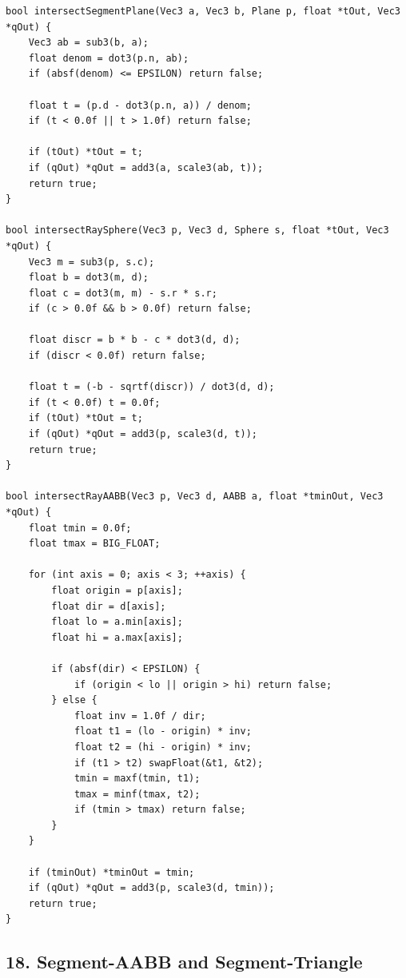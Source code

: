 \documentclass[10pt,letterpaper]{article}
\begin{document}
\begin{verbatim}
bool intersectSegmentPlane(Vec3 a, Vec3 b, Plane p, float *tOut, Vec3 *qOut) {
    Vec3 ab = sub3(b, a);
    float denom = dot3(p.n, ab);
    if (absf(denom) <= EPSILON) return false;

    float t = (p.d - dot3(p.n, a)) / denom;
    if (t < 0.0f || t > 1.0f) return false;

    if (tOut) *tOut = t;
    if (qOut) *qOut = add3(a, scale3(ab, t));
    return true;
}

bool intersectRaySphere(Vec3 p, Vec3 d, Sphere s, float *tOut, Vec3 *qOut) {
    Vec3 m = sub3(p, s.c);
    float b = dot3(m, d);
    float c = dot3(m, m) - s.r * s.r;
    if (c > 0.0f && b > 0.0f) return false;

    float discr = b * b - c * dot3(d, d);
    if (discr < 0.0f) return false;

    float t = (-b - sqrtf(discr)) / dot3(d, d);
    if (t < 0.0f) t = 0.0f;
    if (tOut) *tOut = t;
    if (qOut) *qOut = add3(p, scale3(d, t));
    return true;
}

bool intersectRayAABB(Vec3 p, Vec3 d, AABB a, float *tminOut, Vec3 *qOut) {
    float tmin = 0.0f;
    float tmax = BIG_FLOAT;

    for (int axis = 0; axis < 3; ++axis) {
        float origin = p[axis];
        float dir = d[axis];
        float lo = a.min[axis];
        float hi = a.max[axis];

        if (absf(dir) < EPSILON) {
            if (origin < lo || origin > hi) return false;
        } else {
            float inv = 1.0f / dir;
            float t1 = (lo - origin) * inv;
            float t2 = (hi - origin) * inv;
            if (t1 > t2) swapFloat(&t1, &t2);
            tmin = maxf(tmin, t1);
            tmax = minf(tmax, t2);
            if (tmin > tmax) return false;
        }
    }

    if (tminOut) *tminOut = tmin;
    if (qOut) *qOut = add3(p, scale3(d, tmin));
    return true;
}
\end{verbatim}


\subsection*{18. Segment-AABB and Segment-Triangle}
\end{document}

